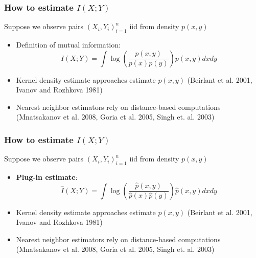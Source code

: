 \documentclass{beamer}
\begin{document}



\begin{frame}
\frametitle{How to estimate $I(X; Y)$}
Suppose we observe pairs $(X_i,Y_i)_{i=1}^n$ iid from density $p(x, y)$
\begin{itemize}
\item Definition of mutual information:
\[
I(X; Y) = \int \log \left(\frac{p(x, y)}{p(x)p(y)}\right) p(x, y) dx dy
\]\pause
\item Kernel density estimate approaches estimate $p(x,y)$ (Beirlant et al. 2001, Ivanov and Rozhkova 1981)
\item Nearest neighbor estimators rely on distance-based computations (Mnatsakanov et al. 2008, Goria et al. 2005, Singh et. al. 2003)
\end{itemize}
\end{frame}

\begin{frame}
\frametitle{How to estimate $I(X; Y)$}
Suppose we observe pairs $(X_i,Y_i)_{i=1}^n$ iid from density $p(x, y)$
\begin{itemize}
\item \textbf{Plug-in estimate}:
\[
\hat{I}(X; Y) = \int \log \left(\frac{\hat{p}(x, y)}{\hat{p}(x)\hat{p}(y)}\right) \hat{p}(x, y) dx dy
\]
\item Kernel density estimate approaches estimate $p(x,y)$ (Beirlant et al. 2001, Ivanov and Rozhkova 1981)
\item Nearest neighbor estimators rely on distance-based computations (Mnatsakanov et al. 2008, Goria et al. 2005, Singh et. al. 2003)
\end{itemize}
\end{frame}
\end{document}
